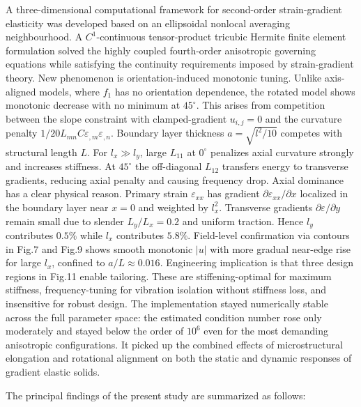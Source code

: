 \documentclass[final,3p,times,fleqn]{elsarticle}
\newcommand{\rev}[1]{\textcolor{revcolor}{#1}}
\begin{document}
A three-dimensional computational framework for second-order
strain-gradient elasticity was developed based on an ellipsoidal
nonlocal averaging neighbourhood. A $C^{1}$-continuous tensor-product tricubic Hermite
finite element formulation solved the highly coupled fourth-order
anisotropic governing equations while satisfying the continuity
requirements imposed by strain-gradient theory.
\rev{New phenomenon is orientation-induced monotonic tuning. Unlike axis-aligned models, where $f_1$ has no orientation dependence, the rotated model shows monotonic decrease with no minimum at $45^\circ$. This arises from competition between the slope constraint with clamped-gradient $u_{i,j}=0$ and the curvature penalty $1/20 L_{mn}C\varepsilon_{,m}\varepsilon_{,n}$. Boundary layer thickness $a=\sqrt{l^2/10}$ competes with structural length $L$. For $l_x\gg l_y$, large $L_{11}$ at $0^\circ$ penalizes axial curvature strongly and increases stiffness. At $45^\circ$ the off-diagonal $L_{12}$ transfers energy to transverse gradients, reducing axial penalty and causing frequency drop. Axial dominance has a clear physical reason. Primary strain $\varepsilon_{xx}$ has gradient $\partial\varepsilon_{xx}/\partial x$ localized in the boundary layer near $x=0$ and weighted by $l_x^2$. Transverse gradients $\partial\varepsilon/\partial y$ remain small due to slender $L_y/L_x=0.2$ and uniform traction. Hence $l_y$ contributes $0.5\%$ while $l_x$ contributes $5.8\%$. Field-level confirmation via contours in Fig.7 and Fig.9 shows smooth monotonic $|u|$ with more gradual near-edge rise for large $l_x$, confined to $a/L\approx0.016$. Engineering implication is that three design regions in Fig.11 enable tailoring. These are stiffening-optimal for maximum stiffness, frequency-tuning for vibration isolation without stiffness loss, and insensitive for robust design.} The implementation stayed numerically
stable across the full parameter space: the estimated condition number
rose only moderately and stayed below the order of $10^{6}$ even for the
most demanding anisotropic configurations. It picked up the combined
effects of microstructural elongation and rotational alignment on both
the static and dynamic responses of gradient elastic solids.

The principal findings of the present study are summarized as follows:
\end{document}
